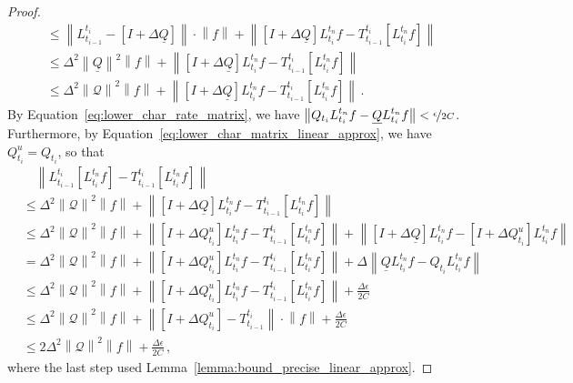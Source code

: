 \documentclass[10pt]{paper}
\theoremstyle{definition}
\newcommand{\lrate}{\underline{Q}}
\newcommand{\norm}[1]{\left\lVert #1 \right\rVert}
\begin{document}
\begin{proof}
\begin{align*}
&\leq \norm{L_{t_{i-1}}^{t_i} - \left[I+\Delta\lrate\right]}\cdot\norm{f} + \norm{\left[I+\Delta\lrate\right]L_{t_i}^{t_n}f - T_{t_{i-1}}^{t_i}\left[L_{t_i}^{t_n}f\right]} \\
&\leq \Delta^2\norm{\lrate}^2\norm{f} + \norm{\left[I+\Delta\lrate\right]L_{t_i}^{t_n}f - T_{t_{i-1}}^{t_i}\left[L_{t_i}^{t_n}f\right]} \\
&\leq \Delta^2\norm{\mathcal{Q}}^2\norm{f} + \norm{\left[I+\Delta\lrate\right]L_{t_i}^{t_n}f - T_{t_{i-1}}^{t_i}\left[L_{t_i}^{t_n}f\right]}\,.
\end{align*}
By Equation~\eqref{eq:lower_char_rate_matrix}, we have $\norm{Q_{t_i}L_{t_i}^{t_n}f - \lrate L_{t_i}^{t_n}f} < \nicefrac{\epsilon}{2C}$. Furthermore, by Equation~\eqref{eq:lower_char_matrix_linear_approx}, we have $Q_{t_i}^u=Q_{t_i}$, so that
\begin{align*}
 &\quad \norm{L_{t_{i-1}}^{t_i}\left[L_{t_i}^{t_n}f\right] - T_{t_{i-1}}^{t_i}\left[L_{t_i}^{t_n}f\right]} \\
 &\leq \Delta^2\norm{\mathcal{Q}}^2\norm{f} + \norm{\left[I+\Delta\lrate\right]L_{t_i}^{t_n}f - T_{t_{i-1}}^{t_i}\left[L_{t_i}^{t_n}f\right]} \\
 &\leq \Delta^2\norm{\mathcal{Q}}^2\norm{f} + \norm{\left[I+\Delta Q_{t_i}^u\right]L_{t_i}^{t_n}f - T_{t_{i-1}}^{t_i}\left[L_{t_i}^{t_n}f\right]} + \norm{\left[I+\Delta \lrate\right]L_{t_i}^{t_n}f - \left[I+\Delta Q_{t_i}^u\right]L_{t_i}^{t_n}f} \\
 &= \Delta^2\norm{\mathcal{Q}}^2\norm{f} + \norm{\left[I+\Delta Q_{t_i}^u\right]L_{t_i}^{t_n}f - T_{t_{i-1}}^{t_i}\left[L_{t_i}^{t_n}f\right]} + \Delta\norm{\lrate L_{t_i}^{t_n}f - Q_{t_i}L_{t_i}^{t_n}f} \\
 &\leq \Delta^2\norm{\mathcal{Q}}^2\norm{f} + \norm{\left[I+\Delta Q_{t_i}^u\right]L_{t_i}^{t_n}f - T_{t_{i-1}}^{t_i}\left[L_{t_i}^{t_n}f\right]} + \frac{\Delta\epsilon}{2C} \\
 &\leq \Delta^2\norm{\mathcal{Q}}^2\norm{f} + \norm{\left[I+\Delta Q_{t_i}^u\right] - T_{t_{i-1}}^{t_i}}\cdot\norm{f} + \frac{\Delta\epsilon}{2C} \\
 &\leq 2\Delta^2\norm{\mathcal{Q}}^2\norm{f} + \frac{\Delta\epsilon}{2C}\,,
\end{align*}
where the last step used Lemma~\ref{lemma:bound_precise_linear_approx}.


\end{proof}
\end{document}
